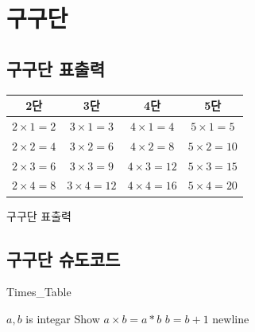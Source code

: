 \documentclass[a4paper]{article}
\begin{document}
\section{구구단}
\subsection{구구단 표출력}
\begin{center}
\begin{tabular}[h]{|c|c|c|c|}
\hline
2단&3단&4단&5단\\
\hline
$2\times1=2$&$3\times1=3$&$4\times1=4$&$5\times1=5$\\
\hline
$2\times2=4$&$3\times2=6$&$4\times2=8$&$5\times2=10$\\
\hline
$2\times3=6$&$3\times3=9$&$4\times3=12$&$5\times3=15$\\
\hline
$2\times4=8$&$3\times4=12$&$4\times4=16$&$5\times4=20$\\
\hline
\end{tabular}
\end{center}

구구단 표출력
\subsection{구구단 슈도코드}
\begin{algorithm}
	\caption{ Times\_Table }
	\begin{algorithmic}[1]
		\State $a, b$ is integar
			\State Show $a \times b = a*b$
			\State $b = b+1$
			\EndFor
		\State newline
		\EndFor
	\end{algorithmic}
\end{algorithm}
			
	
\end{document}
